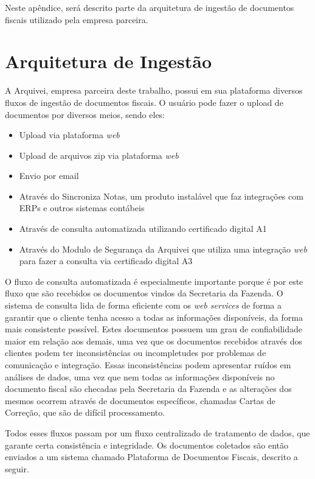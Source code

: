 
Neste apêndice, será descrito parte da arquitetura de ingestão de documentos fiscais utilizado pela empresa parceira.

\section{Arquitetura de Ingestão}

A Arquivei, empresa parceira deste trabalho, possui em sua plataforma diversos fluxos de ingestão de documentos fiscais. O usuário pode fazer o upload de documentos por diversos meios, sendo eles:

\begin{itemize}
    \item Upload via plataforma \textit{web}
    \item Upload de arquivos zip via plataforma \textit{web}
    \item Envio por email
    \item Através do Sincroniza Notas, um produto instalável que faz integrações com ERPs e outros sistemas contábeis
    \item Através de consulta automatizada utilizando certificado digital A1
    \item Através do Modulo de Segurança da Arquivei que utiliza uma integração \textit{web} para fazer a consulta via certificado digital A3
\end{itemize}

O fluxo de consulta automatizada é especialmente importante porque é por este fluxo que são recebidos os documentos vindos da Secretaria da Fazenda. O sistema de consulta lida de forma eficiente com os \textit{web services} de forma a garantir que o cliente tenha acesso a todas as informações disponíveis, da forma mais consistente possível. Estes documentos possuem um grau de confiabilidade maior em relação aos demais, uma vez que os documentos recebidos através dos clientes podem ter inconsistências ou incompletudes por problemas de comunicação e integração. Essas inconsistências podem apresentar ruídos em análises de dados, uma vez que nem todas as informações disponíveis no documento fiscal são checadas pela Secretaria da Fazenda e as alterações dos mesmos ocorrem através de documentos específicos, chamadas Cartas de Correção, que são de difícil processamento.

Todos esses fluxos passam por um fluxo centralizado de tratamento de dados, que garante certa consistência e integridade. Os documentos coletados são então enviados a um sistema chamado Plataforma de Documentos Fiscais, descrito a seguir.

